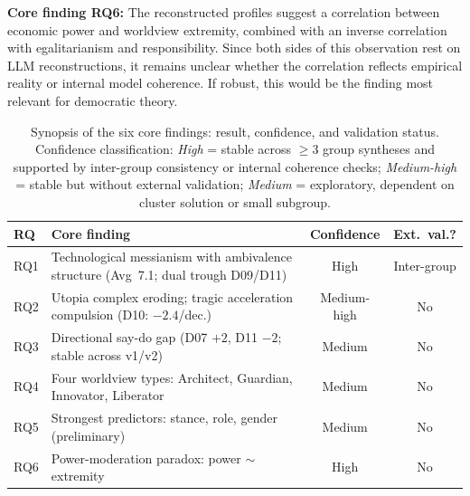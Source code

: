 \documentclass[12pt,a4paper]{article}
\begin{document}
\medskip
\noindent\textbf{Core finding RQ6:} The reconstructed profiles suggest a correlation between economic power and worldview extremity, combined with an inverse correlation with egalitarianism and responsibility. Since both sides of this observation rest on LLM reconstructions, it remains unclear whether the correlation reflects empirical reality or internal model coherence. If robust, this would be the finding most relevant for democratic theory.



\begin{table}[htbp]
  \centering
  \caption{Synopsis of the six core findings: result, confidence, and validation status. Confidence classification: \emph{High} = stable across $\geq 3$ group syntheses and supported by inter-group consistency or internal coherence checks; \emph{Medium-high} = stable but without external validation; \emph{Medium} = exploratory, dependent on cluster solution or small subgroup.}
  \label{tab:synopse}
  \footnotesize
  \begin{tabularx}{\textwidth}{l X c c}
    \toprule
    \textbf{RQ} & \textbf{Core finding} & \textbf{Confidence} & \textbf{Ext.\ val.?} \\
    \midrule
    RQ1 & Technological messianism with ambivalence structure (Avg~7.1; dual trough D09/D11) & High & Inter-group \\
    RQ2 & Utopia complex eroding; tragic acceleration compulsion (D10: $-2.4$/dec.) & Medium-high & No \\
    RQ3 & Directional say-do gap (D07 $+2$, D11 $-2$; stable across v1/v2) & Medium & No \\
    RQ4 & Four worldview types: Architect, Guardian, Innovator, Liberator & Medium & No \\
    RQ5 & Strongest predictors: stance, role, gender (preliminary) & Medium & No \\
    RQ6 & Power-moderation paradox: power $\sim$ extremity & High & No \\
    \bottomrule
  \end{tabularx}
\end{table}

\end{document}
